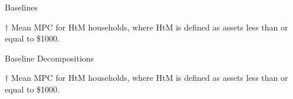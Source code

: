 \documentclass[9pt]{extarticle}
\begin{document}
\begin{table}[h]
\caption{Baselines}
\begin{threeparttable}
\centering


\begin{tablenotes}
	\item[$\dagger$] Mean MPC for HtM households, where HtM is defined as assets less than or equal to \$1000.
\end{tablenotes}
\end{threeparttable}
\end{table}

\begin{table}[h]
\caption{Baseline Decompositions}
\begin{threeparttable}
\centering


\begin{tablenotes}
	\item[$\dagger$] Mean MPC for HtM households, where HtM is defined as assets less than or equal to \$1000.
\end{tablenotes}
\end{threeparttable}
\end{table}

\clearpage
\end{document}
